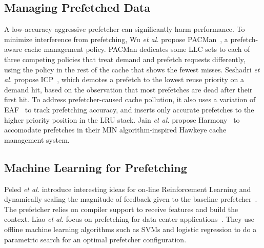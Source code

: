 
\subsection{Managing Prefetched Data}


A low-accuracy aggressive prefetcher can significantly harm
performance.  To minimize interference from prefetching, Wu \textit{et
  al.} propose PACMan~\cite{pacman}, a prefetch-aware cache management
policy. PACMan dedicates some LLC sets to each of three competing
policies that treat demand and prefetch requests differently, using
the policy in the rest of the cache that shows the fewest
misses. Seshadri \textit{et al.} propose ICP~\cite{icp}, which demotes
a prefetch to the lowest reuse priority on a demand hit, based on the
observation that most prefetches are dead after their first hit. To
address prefetcher-caused cache pollution, it also uses a variation of
EAF~\cite{eaf} to track prefetching accuracy, and inserts only
accurate prefetches to the higher priority position in the LRU
stack. Jain \textit{et al.} propose Harmony~\cite{Harmony} to
accomodate prefetches in their MIN algorithm-inspired Hawkeye cache
management system.

\subsection{Machine Learning for Prefetching}

Peled \textit{et al.} introduce interesting ideas for on-line
Reinforcement Learning and dynamically scaling the magnitude of
feedback given to the baseline prefetcher~\cite{Semantics}. The
prefetcher relies on compiler support to receive features and build
the context.  Liao \textit{et al.}  focus on prefetching for data
center applications~\cite{Datacenter}.  They use offline machine
learning algorithms such as SVMs and logistic regression to do a
parametric search for an optimal prefetcher configuration.
